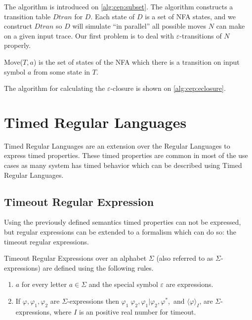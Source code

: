 			The algorithm is introduced on \cref{alg:cep:subset}.
			The algorithm constructs a transition table $\mathit{Dtran}$ for $D$. Each state of $D$ is a set of NFA states, and we construct $\mathit{Dtran}$ so $D$ will simulate ``in parallel'' all possible moves $N$ can make on a given input trace. Our first problem is to deal with $\varepsilon$-transitions of $N$ properly.
	
			Move($T,a$) is the set of states of the NFA which there is a transition on input symbol $a$ from some state in $T$.
			
			The algorithm for calculating the $\varepsilon$-closure is shown on \cref{alg:cep:eclosure}.
			
		\section{Timed Regular Languages}	
		
		Timed Regular Languages are an extension over the Regular Languages to express timed properties.
		These timed properties are common in most of the use cases as many system has timed behavior which can be described using Timed Regular Languages.
		
			\subsection{Timeout Regular Expression}
		
			Using the previously defined semantics timed properties can not be expressed, but regular expressions can be extended to a formalism which can do so: the timeout regular expressions.
			
			\begin{dfn}
				\label{dfn:cep:tre}
				Timeout Regular Expressions over an alphabet $\Sigma$ (also referred to as $\Sigma$-expressions)
				are defined using the following rules.
				\begin{enumerate}
					\item $a$ for every letter $a \in \Sigma$ and the special symbol $\varepsilon$ are expressions.
					\item If $\varphi, \varphi_1, \varphi_2$ are $\Sigma$-expressions then %
						$ %
						\varphi_1 \; \varphi_2,
						\varphi_1 | \varphi_2,
						\varphi^\ast,$ and 
						$\langle \varphi \rangle_I$, 
						are $\Sigma$-expressions, where $I$ is an positive real number for timeout. %
				\end{enumerate}
			\end{dfn}
	
